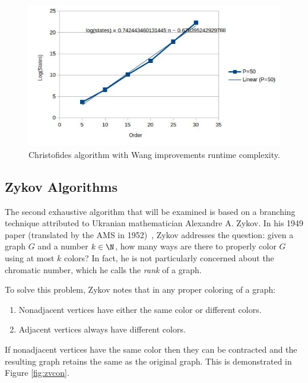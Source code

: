 \begin{figure}[H]
  \centering
  \includegraphics[width=5in]{wang_runtime}
  \caption{Christofides algorithm with Wang improvements runtime complexity.}
  \label{fig:wangruntime}
\end{figure}

\subsection{Zykov Algorithms}\label{sec:sub:zykov}

The second exhaustive algorithm that will be examined is based on a branching technique attributed to Ukranian
mathematician Alexandre A. Zykov.  In his 1949 paper (translated by the AMS in 1952)~\cite{zykov}, Zykov addresses
the question: given a graph \(G\) and a number \(k\in\N\), how many ways are there to properly color \(G\) using at
most \(k\) colors?  In fact, he is not particularly concerned about the chromatic number, which he calls the
\emph{rank} of a graph.

To solve this problem, Zykov notes that in any proper coloring of a graph:
\begin{enumerate}
\item Nonadjacent vertices have either the same color or different colors.
\item Adjacent vertices always have different colors.
\end{enumerate}
If nonadjacent vertices have the same color then they can be contracted and the resulting graph retains the same
 as the original graph.  This is demonstrated in Figure \ref{fig:zvcon}.

